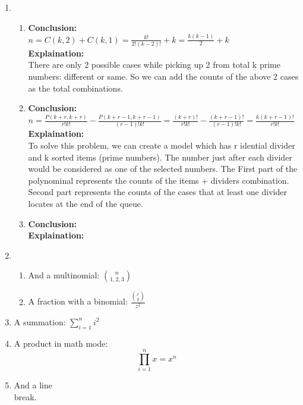 \documentclass{article}
\begin{document}
\thispagestyle{fancy} %

\begin{enumerate}


	\item 
	
	\begin{enumerate}
		\item
		\textbf{Conclusion:} \\
		${ n = C(k,2) + C(k,1) = \frac{k!}{2!(k-2)!}+k=\frac{k(k-1)}{2}+k}$\\
		\textbf{Explaination:} \\
		There are only 2 possible cases while picking up 2 from total k prime numbers: different or same. So we can add the counts of the above 2 cases as the total combinations.
		
		\item
		\textbf{Conclusion:}\\
		${ n = \frac{P(k+r,k+r)}{r!k!}  -\frac{P(k+r-1,k+r-1)}{(r-1)!k!}= \frac{(k+r)!}{r!k!}-\frac{(k+r-1)!}{(r-1)!k!} = \frac{k(k+r-1)!}{r!k!}}$\\
		\textbf{Explaination:}\\
		To solve this problem, we can create a model which has r idential divider and k sorted items (prime numbers). The number just after each divider would be considered as one of the selected numbers. The  First part of the polynominal represents the counts of the items + dividers combination. Second part represents the counts of the cases that at least one divider locates at the end of the queue.
		
		\item \textbf{Conclusion:}\\
		\textbf{Explaination:}
		
		

	\end{enumerate}
	\item

	
	\begin{enumerate}
		
		\item And a multinomial: ${n \choose 1, 2, 3}$
		
		\item A fraction with a binomial: $\frac{{x \choose y}}{z^2}$
	
	\end{enumerate}
	
	\item A summation: $\sum\limits_{i=1}^n i^2$
	
	\item A product in math mode: \[\prod\limits_{i=1}^n x = x^n\]
	
	\item And a line \\ break.


\end{enumerate}

\newpage
\end{document}
